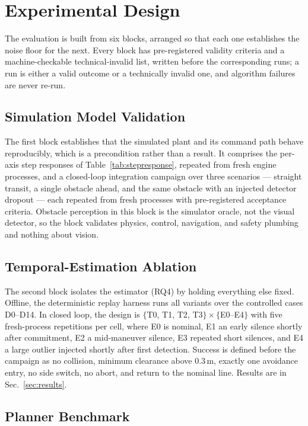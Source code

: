 \section{Experimental Design}
\label{sec:design}

The evaluation is built from six blocks, arranged so that each one
establishes the noise floor for the next. Every block has pre-registered
validity criteria and a machine-checkable technical-invalid list, written
before the corresponding runs; a run is either a valid outcome or a
technically invalid one, and algorithm failures are never re-run.

\subsection{Simulation Model Validation}

The first block establishes that the simulated plant and its command path
behave reproducibly, which is a precondition rather than a result. It
comprises the per-axis step responses of Table~\ref{tab:stepresponse},
repeated from fresh engine processes, and a closed-loop integration campaign
over three scenarios --- straight transit, a single obstacle ahead, and the
same obstacle with an injected detector dropout --- each repeated from fresh
processes with pre-registered acceptance criteria. Obstacle perception in
this block is the simulator oracle, not the visual detector, so the block
validates physics, control, navigation, and safety plumbing and nothing
about vision.

\subsection{Temporal-Estimation Ablation}

The second block isolates the estimator (RQ4) by holding everything else
fixed. Offline, the deterministic replay harness runs all variants over the
controlled cases D0--D14. In closed loop, the design is
$\{$T0, T1, T2, T3$\} \times \{$E0--E4$\}$ with five fresh-process
repetitions per cell, where E0 is nominal, E1 an early silence shortly after
commitment, E2 a mid-maneuver silence, E3 repeated short silences, and E4 a
large outlier injected shortly after first detection. Success is defined
before the campaign as no collision, minimum clearance above 0.3\,m, exactly
one avoidance entry, no side switch, no abort, and return to the nominal
line. Results are in Sec.~\ref{sec:results}.

\subsection{Planner Benchmark}

